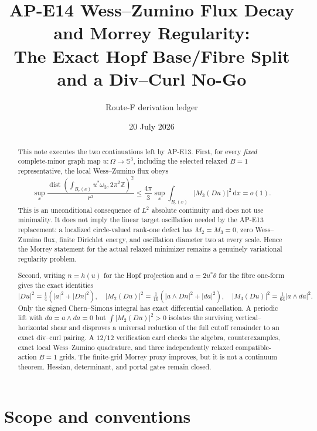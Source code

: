 \documentclass[11pt]{article}
\title{AP-E14 Wess--Zumino Flux Decay and Morrey Regularity:\\
The Exact Hopf Base/Fibre Split and a Div--Curl No-Go}
\author{Route-F derivation ledger}
\date{20 July 2026}
\newcommand{\dd}{\,\mathrm d}
\newcommand{\SSS}{\mathbb S}
\newcommand{\dist}{\operatorname{dist}}
\begin{document}
\maketitle

\begin{abstract}
This note executes the two continuations left by AP-E13.  First, for every
\emph{fixed} complete-minor graph map $u:\Omega\to\SSS^3$, including the
selected relaxed $B=1$ representative, the local Wess--Zumino flux obeys
\[
 \sup_x\frac{\dist(\int_{B_r(x)}u^*\omega_3,
 2\pi^2\mathbb Z)^2}{r^3}
 \leq \frac{4\pi}{3}\sup_x\int_{B_r(x)}|M_3(Du)|^2\dd x=o(1).
\]
This is an unconditional consequence of $L^2$ absolute continuity and does
not use minimality.  It does not imply the linear target oscillation needed
by the AP-E13 replacement: a localized circle-valued rank-one defect has
$M_2=M_3=0$, zero Wess--Zumino flux, finite Dirichlet energy, and oscillation
diameter two at every scale.  Hence the Morrey statement for the actual
relaxed minimizer remains a genuinely variational regularity problem.

Second, writing $n=h(u)$ for the Hopf projection and $a=2u^*\theta$ for the
fibre one-form gives the exact identities
\[
 |Du|^2=\tfrac14(|a|^2+|Dn|^2),\quad
 |M_2(Du)|^2=\tfrac1{16}(|a\wedge Dn|^2+|da|^2),\quad
 |M_3(Du)|^2=\tfrac1{64}|a\wedge da|^2.
\]
Only the signed Chern--Simons integral has exact differential cancellation.
A periodic lift with $da=a\wedge da=0$ but
$\int|M_2(Du)|^2>0$ isolates the surviving vertical--horizontal shear and
disproves a universal reduction of the full cutoff remainder to an exact
div--curl pairing.  A $12/12$ verification card checks the algebra,
counterexamples, exact local Wess--Zumino quadrature, and three independently
relaxed compatible-action $B=1$ grids.  The finite-grid Morrey proxy improves,
but it is not a continuum theorem.  Hessian, determinant, and portal gates
remain closed.
\end{abstract}

\tableofcontents

\section{Scope and conventions}
\end{document}
